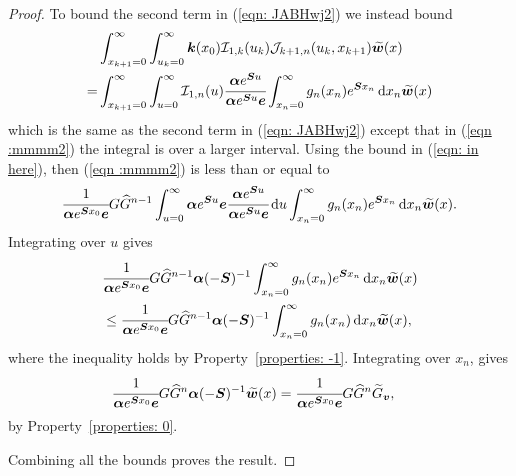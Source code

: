 \begin{proof}
To bound the second term in (\ref{eqn: JABHwj2}) we instead bound 
	\begin{align}
		&\int_{x_{k+1}=0}^\infty \int_{u_k=0}^\infty \boldsymbol k(x_0)\mathcal I_{1,k}(u_k) \mathcal J_{k+1,n}(u_k,x_{k+1})\widetilde{\boldsymbol w}(x) \nonumber
		\\= &\int_{x_{k+1}=0}^\infty \int_{u=0}^\infty \mathcal I_{1,n}(u) \cfrac{\boldsymbol\alpha e^{\boldsymbol Su}}{\boldsymbol\alpha e^{\boldsymbol Su}\boldsymbol e}\int_{x_n=0}^\infty g_n(x_n)e^{\boldsymbol Sx_n}\, \mathrm{d} x_n\widetilde{\boldsymbol w}(x)
		\label{eqn :mmmm2}
	\end{align}
	which is the same as the second term in (\ref{eqn: JABHwj2}) except that in (\ref{eqn :mmmm2}) the integral is over a larger interval. Using the bound in (\ref{eqn: in here}), then (\ref{eqn :mmmm2}) is less than or equal to 
	\begin{align*}
		\cfrac{1}{\boldsymbol \alpha e^{\boldsymbol{S}x_0}\boldsymbol e}G\widehat G^{n-1} \int_{u=0}^\infty \boldsymbol \alpha e^{\boldsymbol{S}u}\boldsymbol e \cfrac{\boldsymbol \alpha e^{\boldsymbol S u}}{\boldsymbol \alpha e^{\boldsymbol S u} \boldsymbol e}\, \mathrm{d} u \int_{x_n=0}^\infty g_{n}(x_n) e^{\boldsymbol{S}x_n} \, \mathrm{d} x_n \widetilde{\boldsymbol w}(x).
	\end{align*}
	Integrating over \(u\) gives 
	\begin{align*}
		&\cfrac{1}{\boldsymbol \alpha e^{\boldsymbol{S}x_0}\boldsymbol e}G\widehat G^{n-1} \boldsymbol \alpha (-\boldsymbol S)^{-1} \int_{x_n=0}^\infty g_{n}(x_n) e^{\boldsymbol{S}x_n} \, \mathrm{d} x_n \widetilde{\boldsymbol w}(x) 
		\\&\leq \cfrac{1}{\boldsymbol \alpha e^{\boldsymbol{S}x_0}\boldsymbol e}G\widehat G^{n-1} \boldsymbol \alpha (-\boldsymbol S)^{-1} \int_{x_n=0}^\infty g_{n}(x_n) \, \mathrm{d} x_n \widetilde{\boldsymbol w}(x),
	\end{align*}
	where the inequality holds by Property~\ref{properties: -1}. Integrating over \(x_n\), gives
	\begin{align}
		\cfrac{1}{\boldsymbol \alpha e^{\boldsymbol{S}x_0}\boldsymbol e}G\widehat G^{n} \boldsymbol \alpha (-\boldsymbol S)^{-1} \widetilde{\boldsymbol w}(x) 
		&=\cfrac{1}{\boldsymbol \alpha e^{\boldsymbol{S}x_0}\boldsymbol e}G\widehat G^{n}\widetilde G_{\boldsymbol v},\label{eqn:FGHJSjjs sj}
	\end{align}
	by Property~\ref{properties: 0}.

	Combining all the bounds proves the result. 
\end{proof}	

